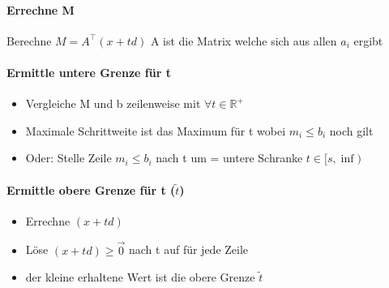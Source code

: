 \documentclass[12pt,a4paper, hyperref]{article}
\newcommand{\tsnake}[1]{\ensuremath{\tilde{#1}}}
\begin{document}
\paragraph{Errechne M\\}

Berechne $M = A^\intercal (x + td)$ A ist die Matrix welche sich aus allen $a_i$ ergibt

\paragraph{Ermittle untere Grenze für t\\}
\begin{itemize}
\item Vergleiche M und b zeilenweise mit $\forall t \in \mathbb{R}^+$
\item Maximale Schrittweite ist das Maximum für t wobei $m_i \leq b_i$ noch gilt
\item Oder: Stelle Zeile $m_i \leq b_i$ nach t um = untere Schranke $t \in [s, \inf)$
\end{itemize}

\paragraph{Ermittle obere Grenze für t (\tsnake t)\\}
\begin{itemize}
\item Errechne $(x+td)$
\item Löse $(x+td) \geq \vec{0}$ nach t auf für jede Zeile
\item der kleine erhaltene Wert ist die obere Grenze \tsnake t
\end{itemize}
\end{document}
